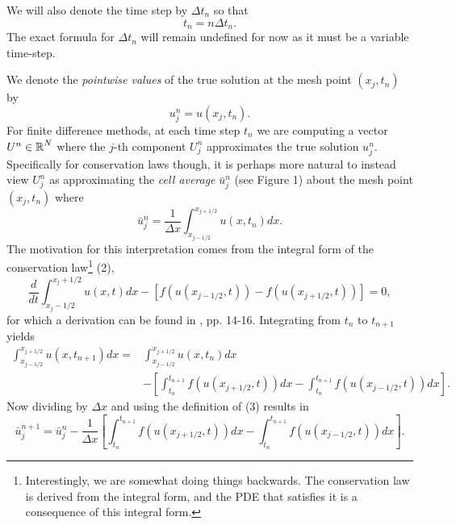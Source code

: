\documentclass{myproject}
\begin{document}
We will also denote the time step by $\Delta t_n$ so that
\[
    t_n = n\Delta t_n.
\]
The exact formula for $\Delta t_n$ will remain undefined for now as it must be a variable time-step.

We denote the \emph{pointwise values} of the true solution at the mesh point $(x_j, t_n)$ by 
\[
    u_j^n = u(x_j,t_n).
\]
For finite difference methods, at each time step $t_n$ we are computing a vector $U^n \in \operatorname{\mathbb{R}}^N$ where the $j$-th component $U_j^n$ approximates the true solution $u_j^n$. Specifically for conservation laws though, it is perhaps more natural to instead view $U_j^n$ as approximating the \emph{cell average} $\bar{u}_j^n$ (see Figure 1) about the mesh point $(x_j,t_n)$ where
\begin{equation}
    \bar{u}_j^n = \frac{1}{\Delta x} \int_{x_{j-1/2}}^{x_{j+1/2}} u(x,t_n) dx.
\end{equation}
The motivation for this interpretation comes from the integral form of the conservation law\footnote{Interestingly, we are somewhat doing things backwards. The conservation law is derived from the integral form, and the PDE that satisfies it is a consequence of this integral form.} (2),
\[
    \frac{d}{dt} \int_{x_j-1/2}^{x_j+1/2} u(x,t)dx - \left[ f(u(x_{j-1/2},t)) - f(u(x_{j+1/2},t)) \right] = 0,
\]
for which a derivation can be found in \cite{leveque1992}, pp. 14-16. Integrating from $t_n$ to $t_{n+1}$ yields
\begin{align*}
    \int_{x_{j-1/2}}^{x_{j+1/2}} u(x,t_{n+1}) dx = &\int_{x_{j-1/2}}^{x_{j+1/2}} u(x,t_{n}) dx \\
    &- \left[ \int_{t_n}^{t_{n+1}} f(u(x_{j+1/2},t)) dx - \int_{t_n}^{t_{n+1}} f(u(x_{j-1/2},t)) dx \right].
\end{align*}
Now dividing by $\Delta x$ and using the definition of (3) results in
\begin{equation}
    \bar{u}_j^{n+1} = \bar{u}_j^n - \frac{1}{\Delta x}\left[ \int_{t_n}^{t_{n+1}} f(u(x_{j+1/2},t)) dx - \int_{t_n}^{t_{n+1}} f(u(x_{j-1/2},t)) dx \right].
\end{equation}
\end{document}
